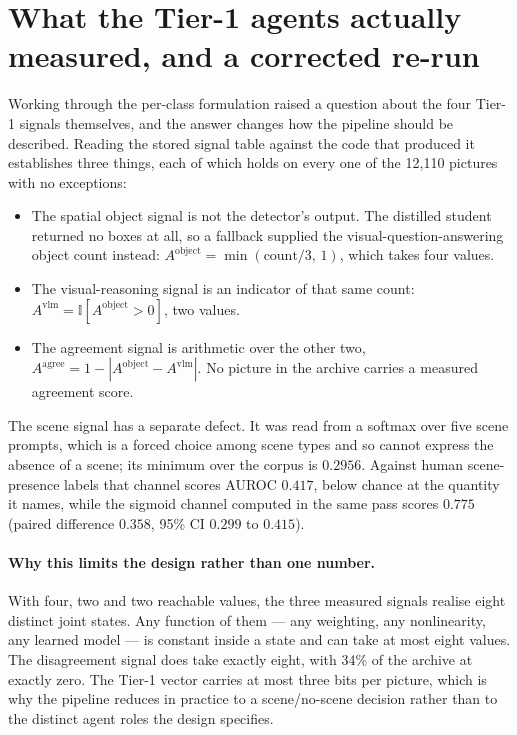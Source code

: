 \documentclass[11pt,a4paper]{article}
\begin{document}
\section{What the Tier-1 agents actually measured, and a corrected re-run}

Working through the per-class formulation raised a question about the four Tier-1 signals themselves,
and the answer changes how the pipeline should be described. Reading the stored signal table against
the code that produced it establishes three things, each of which holds on every one of the 12,110
pictures with no exceptions:

\begin{itemize}\itemsep2pt
  \item The spatial object signal is not the detector's output. The distilled student returned no boxes
        at all, so a fallback supplied the visual-question-answering object count instead:
        $A^{\text{object}} = \min(\text{count}/3,\,1)$, which takes four values.
  \item The visual-reasoning signal is an indicator of that same count:
        $A^{\text{vlm}} = \mathbb{I}[A^{\text{object}} > 0]$, two values.
  \item The agreement signal is arithmetic over the other two,
        $A^{\text{agree}} = 1 - |A^{\text{object}} - A^{\text{vlm}}|$. No picture in the archive carries a
        measured agreement score.
\end{itemize}

The scene signal has a separate defect. It was read from a softmax over five scene prompts, which is a
forced choice among scene types and so cannot express the absence of a scene; its minimum over the
corpus is $0.2956$. Against human scene-presence labels that channel scores AUROC $0.417$, below
chance at the quantity it names, while the sigmoid channel computed in the same pass scores $0.775$
(paired difference $0.358$, 95\% CI $0.299$ to $0.415$).

\paragraph{Why this limits the design rather than one number.} With four, two and two reachable values,
the three measured signals realise eight distinct joint states. Any function of them --- any weighting,
any nonlinearity, any learned model --- is constant inside a state and can take at most eight values.
The disagreement signal does take exactly eight, with 34\% of the archive at exactly zero. The Tier-1
vector carries at most three bits per picture, which is why the pipeline reduces in practice to a
scene/no-scene decision rather than to the distinct agent roles the design specifies.
\end{document}
